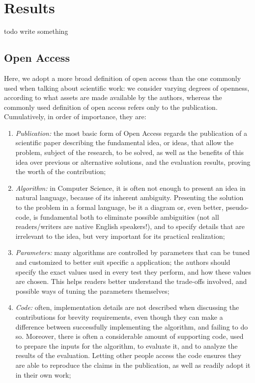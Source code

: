 \documentclass[12pt]{article}
\begin{document}
\section{Results}
\label{sec:orgb8f7f1e}
todo write something

\subsection{Open Access}
\label{sec:org5d282ce}
Here, we adopt a more broad definition of open access than the one commonly used when talking about scientific work: we consider varying degrees of openness, according to what assets are made available by the authors, whereas the commonly used definition of open access refers only to the publication. Cumulatively, in order of importance, they are:

\begin{enumerate}
\item \emph{Publication:} the most basic form of Open Access regards the publication of a scientific paper describing the fundamental idea, or ideas, that allow the problem, subject of the research, to be solved, as well as the benefits of this idea over previous or alternative solutions, and the evaluation results, proving the worth of the contribution;
\item \emph{Algorithm:} in Computer Science, it is often not enough to present an idea in natural language, because of its inherent ambiguity. Presenting the solution to the problem in a formal language, be it a diagram or, even better, pseudo-code, is fundamental both to eliminate possible ambiguities (not all readers/writers are native English speakers!), and to specify details that are irrelevant to the idea, but very important for its practical realization;
\item \emph{Parameters:} many algorithms are controlled by parameters that can be tuned and customized to better suit specific a application; the authors should specify the exact values used in every test they perform, and how these values are chosen. This helps readers better understand the trade-offs involved, and possible ways of tuning the parameters themselves;
\item \emph{Code:} often, implementation details are not described when discussing the contributions for brevity requirements, even though they can make a difference between successfully implementing the algorithm, and failing to do so. Moreover, there is often a considerable amount of supporting code, used to prepare the inputs for the algorithm, to evaluate it, and to analyze the results of the evaluation. Letting other people access the code ensures they are able to reproduce the claims in the publication, as well as readily adopt it in their own work;

\end{enumerate}
\end{document}
